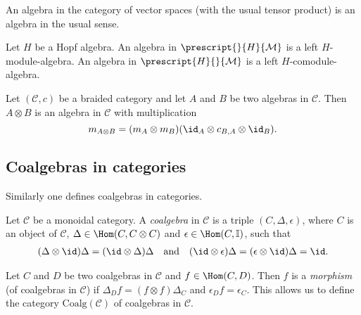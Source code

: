 \documentclass[12pt]{amsproc}
\newcommand{\lmod}[1]{\prescript{}{#1}{\mathcal{M}}}
\newcommand{\lcomod}[1]{\prescript{#1}{}{\mathcal{M}}}
\begin{document}
\begin{example}
An algebra in the category of vector spaces (with the usual tensor product) is an algebra in
the usual sense.
\end{example}

\begin{example}
Let $H$ be a Hopf algebra. An algebra in $\lmod{H}$ is a left $H$-module-algebra. 
An algebra in $\lcomod{H}$ 
is a left 
$H$-comodule-algebra.
\end{example}




\begin{example}
Let $(\mathcal{C},c)$ be a braided category and let $A$ and $B$ be two algebras
in $\mathcal{C}$. Then $A\otimes B$ is an algebra in $\mathcal{C}$ with
multiplication 
\[
m_{A\otimes B}=(m_A\otimes m_B)(\id_A\otimes c_{B,A}\otimes \id_B).
\]
\end{example}

\subsection{Coalgebras in categories}
Similarly one defines coalgebras in categories.

\begin{definition}
Let $\mathcal{C}$ be a monoidal category. A \emph{coalgebra}
in $\mathcal{C}$ is a triple $(C,\Delta,\epsilon)$, where
$C$ is an object of $\mathcal{C}$, $\Delta\in\Hom(C,C\otimes C)$
and $\epsilon\in\Hom(C,\mathbb{I})$, such that 
\begin{gather*}
(\Delta\otimes\id)\Delta=(\id\otimes\Delta)\Delta\quad\text{and}\quad 
(\id\otimes\epsilon)\Delta=(\epsilon\otimes\id)\Delta=\id.
\end{gather*}
\end{definition}

Let $C$ and $D$ be two coalgebras in $\mathcal{C}$ and $f\in\Hom(C,D)$.
Then $f$ is a \emph{morphism} (of coalgebras in $\mathcal{C}$)
if $\Delta_{D}f=(f\otimes f)\Delta_{C}$ and $\epsilon_{D}f=\epsilon_{C}$. 
This allows us to define the category $\mathrm{Coalg}(\mathcal{C})$
of coalgebras in $\mathcal{C}$.
\end{document}
